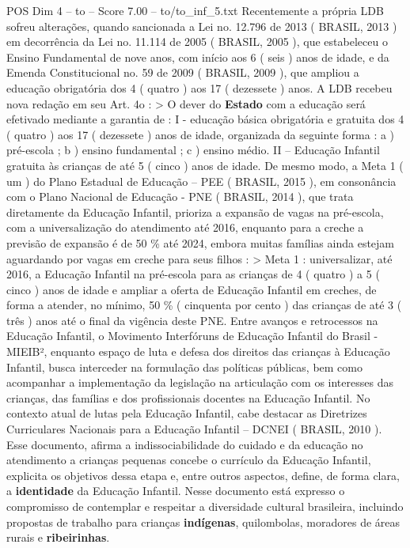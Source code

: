 \begin{textsample}{POS Dim 4 – to – Score 7.00 – to/to\_inf\_5.txt}
Recentemente a própria LDB sofreu alterações, quando sancionada a Lei no. 12.796 de 2013 ( BRASIL, 2013 ) em decorrência da Lei no. 11.114 de 2005 ( BRASIL, 2005 ), que estabeleceu o Ensino Fundamental de nove anos, com início aos 6 ( seis ) anos de idade, e da Emenda Constitucional no. 59 de 2009 ( BRASIL, 2009 ), que ampliou a educação obrigatória dos 4 ( quatro ) aos 17 ( dezessete ) anos.
A LDB recebeu nova redação em seu Art. 4o : > O dever do \textbf{Estado} com a educação será efetivado mediante a garantia de : I - educação básica obrigatória e gratuita dos 4 ( quatro ) aos 17 ( dezessete ) anos de idade, organizada da seguinte forma : a ) pré-escola ; b ) ensino fundamental ; c ) ensino médio.
II – Educação Infantil gratuita às crianças de até 5 ( cinco ) anos de idade.
De mesmo modo, a Meta 1 ( um ) do Plano Estadual de Educação – PEE ( BRASIL, 2015 ), em consonância com o Plano Nacional de Educação - PNE ( BRASIL, 2014 ), que trata diretamente da Educação Infantil, prioriza a expansão de vagas na pré-escola, com a universalização do atendimento até 2016, enquanto para a creche a previsão de expansão é de 50 \% até 2024, embora muitas famílias ainda estejam aguardando por vagas em creche para seus filhos : > Meta 1 : universalizar, até 2016, a Educação Infantil na pré-escola para as crianças de 4 ( quatro ) a 5 ( cinco ) anos de idade e ampliar a oferta de Educação Infantil em creches, de forma a atender, no mínimo, 50 \% ( cinquenta por cento ) das crianças de até 3 ( três ) anos até o final da vigência deste PNE.
Entre avanços e retrocessos na Educação Infantil, o Movimento Interfóruns de Educação Infantil do Brasil - MIEIB², enquanto espaço de luta e defesa dos direitos das crianças à Educação Infantil, busca interceder na formulação das políticas públicas, bem como acompanhar a implementação da legislação na articulação com os interesses das crianças, das famílias e dos profissionais docentes na Educação Infantil.
No contexto atual de lutas pela Educação Infantil, cabe destacar as Diretrizes Curriculares Nacionais para a Educação Infantil – DCNEI ( BRASIL, 2010 ).
Esse documento, afirma a indissociabilidade do cuidado e da educação no atendimento a crianças pequenas concebe o currículo da Educação Infantil, explicita os objetivos dessa etapa e, entre outros aspectos, define, de forma clara, a \textbf{identidade} da Educação Infantil.
Nesse documento está expresso o compromisso de contemplar e respeitar a diversidade cultural brasileira, incluindo propostas de trabalho para crianças \textbf{indígenas}, quilombolas, moradores de áreas rurais e \textbf{ribeirinhas}.

\end{textsample}
